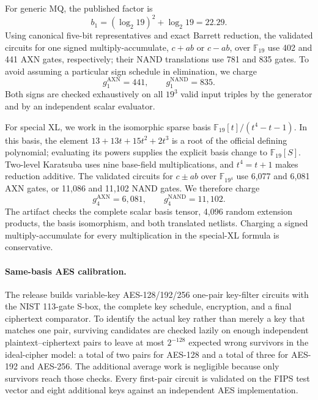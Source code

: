 \documentclass[11pt]{article}
\newcommand{\F}{\mathbb F}
\begin{document}
For generic MQ, the published factor is
\begin{equation}\label{eq:published-f19-factor}
 b_1=(\log_2 19)^2+\log_2 19=22.29.
\end{equation}
Using canonical five-bit representatives and exact Barrett reduction, the
validated circuits for one signed multiply-accumulate, $c+ab$ or $c-ab$, over
$\F_{19}$ use 402 and 441 AXN gates, respectively; their NAND translations use 781 and 835 gates.  To avoid
assuming a particular sign schedule in elimination, we charge
\begin{equation}\label{eq:axn-f19-factor}
 g_1^{\mathrm{AXN}}=441,
 \qquad g_1^{\mathrm{NAND}}=835.
\end{equation}
Both signs are checked exhaustively on all $19^3$ valid input triples by the
generator and by an independent scalar evaluator.

For special XL, we work in the isomorphic sparse basis
$\F_{19}[t]/(t^4-t-1)$.  In this basis, the element
$13+13t+15t^2+2t^3$ is a root of the official defining polynomial; evaluating
its powers supplies the explicit basis change to $\F_{19}[S]$.  Two-level
Karatsuba uses nine base-field multiplications, and $t^4=t+1$ makes reduction
additive.  The validated circuits for $c\mathbin{\pm}ab$ over $\F_{19^4}$ use
6,077 and 6,081 AXN gates, or 11,086 and 11,102 NAND gates.  We therefore
charge
\begin{equation}\label{eq:axn-f194-factor}
 g_4^{\mathrm{AXN}}=6{,}081,
 \qquad g_4^{\mathrm{NAND}}=11{,}102.
\end{equation}
The artifact checks the complete scalar basis tensor, 4,096 random extension
products, the basis isomorphism, and both translated netlists.  Charging a
signed multiply-accumulate for every multiplication in the special-XL formula
is conservative.

\paragraph{Same-basis AES calibration.}
The release builds variable-key AES-128/192/256 one-pair key-filter circuits
with the NIST 113-gate S-box, the complete key schedule, encryption, and a
final ciphertext comparator.  To identify the actual key rather than merely a
key that matches one pair, surviving candidates are checked lazily on enough
independent plaintext--ciphertext pairs to leave at most $2^{-128}$ expected
wrong survivors in the ideal-cipher model: a total of two pairs for AES-128 and
a total of three for AES-192 and AES-256.  The additional average work is
negligible because only
survivors reach those checks.  Every first-pair circuit is validated on the
FIPS test vector and eight additional keys against an independent AES
implementation.
\end{document}
